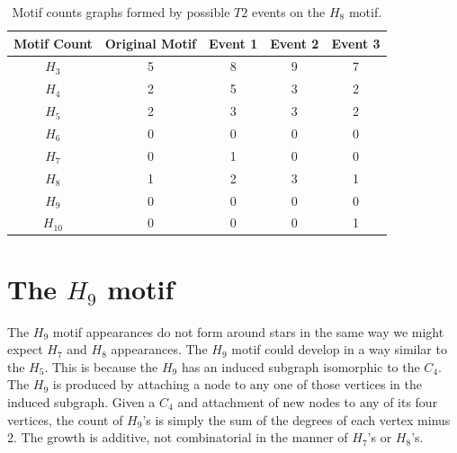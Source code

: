 \FloatBarrier
\begin{table}
    \centering
    \begin{tabular}{||c c c c c||} 
    \hline
    Motif Count & Original Motif & Event 1 & Event 2 & Event 3 \\ [0.5ex] 
    \hline\hline
    $H_{3}$ & 5 & 8 & 9 & 7\\ 
    \hline
    $H_{4}$ & 2 & 5 & 3 & 2 \\
    \hline
    $H_{5}$ & 2 & 3 & 3 & 2 \\
    \hline
    $H_{6}$ & 0 & 0 & 0 & 0 \\
    \hline
    $H_{7}$ & 0 & 1 & 0 & 0 \\
    \hline
    $H_{8}$ & 1 & 2 & 3 & 1\\
    \hline
    $H_{9}$ & 0 & 0 & 0 & 0\\
    \hline
    $H_{10}$ & 0 & 0 & 0 & 1\\
    \hline
   \end{tabular}
   \caption{Motif counts graphs formed by possible $T2$ events on the $H_{8}$ motif.}
   \label{table:6}
\end{table}

\section{ The \texorpdfstring{$H_{9}$}{H9} motif}
The $H_{9}$ motif appearances do not form around stars in the same way we might expect $H_{7}$ and $H_{8}$ appearances.
 The $H_{9}$ motif could develop in a way similar to the $H_{5}$. This is because the $H_{9}$ has an induced subgraph
 isomorphic to the $C_4$. The $H_{9}$ is produced by attaching a node to any one of those vertices in the induced
 subgraph. Given a $C_4$ and attachment
 of new nodes to any of its four vertices, the count of $H_{9}$'s is simply the sum of the degrees of each
 vertex minus 2. The growth is additive, not combinatorial in the manner of $H_{7}$'s or $H_{8}$'s.

